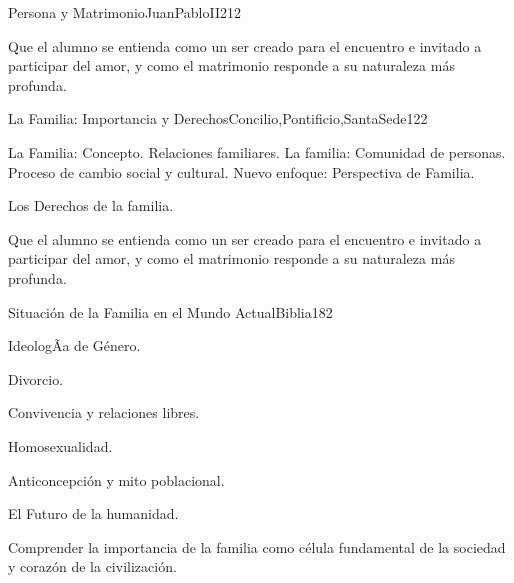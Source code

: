 \begin{syllabus}
\begin{unit}{Persona y Matrimonio}{JuanPabloII}{21}{2}
\begin{unitgoals}
	\item Que el alumno se entienda como un ser creado para el encuentro e invitado a participar del amor, y como el matrimonio responde a su naturaleza más profunda.  
\end{unitgoals}
\end{unit}

\begin{unit}{La Familia: Importancia y Derechos}{Concilio,Pontificio,SantaSede}{12}{2}
\begin{topics}
	\item La Familia: Concepto. Relaciones familiares. La familia: Comunidad de personas. Proceso de cambio social y cultural. Nuevo enfoque: Perspectiva de Familia.
	\item Los Derechos de la familia.	
\end{topics}

\begin{unitgoals}
	\item Que el alumno se entienda como un ser creado para el encuentro e invitado a participar del amor, y como el matrimonio responde a su naturaleza más profunda.  
\end{unitgoals}
\end{unit}

\begin{unit}{Situación de la Familia en el Mundo Actual}{Biblia}{18}{2}
\begin{topics}
	\item IdeologÃ­a de Género.
	\item Divorcio.
	\item Convivencia y relaciones libres.
	\item Homosexualidad.
	\item Anticoncepción y mito poblacional.
	\item El Futuro de la humanidad.

\end{topics}

\begin{unitgoals}
	\item Comprender la importancia de la familia como célula fundamental de la sociedad y corazón de la civilización.
\end{unitgoals}
\end{unit}



\begin{coursebibliography}
\end{coursebibliography}

\end{syllabus}
